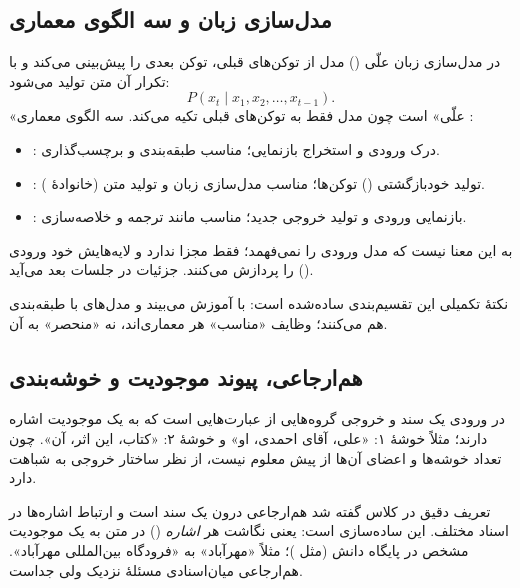 \subsection{مدل‌سازی زبان و سه الگوی معماری}
در مدل‌سازی زبان علّی () مدل از توکن‌های قبلی، توکن بعدی را پیش‌بینی می‌کند و با تکرار آن متن تولید می‌شود:
\[
P(x_t\mid x_1,x_2,\ldots,x_{t-1}).
\]
«علّی» است چون مدل فقط به توکن‌های قبلی تکیه می‌کند. سه الگوی معماری :
\begin{itemize}
  \item \textbf{}: درک ورودی و استخراج بازنمایی؛ مناسب طبقه‌بندی و برچسب‌گذاری.
  \item \textbf{}: تولید خودبازگشتی () توکن‌ها؛ مناسب مدل‌سازی زبان و تولید متن (خانوادهٔ ).
  \item \textbf{}: بازنمایی ورودی و تولید خروجی جدید؛ مناسب  مانند ترجمه و خلاصه‌سازی.
\end{itemize}
 به این معنا نیست که مدل ورودی را نمی‌فهمد؛ فقط  مجزا ندارد و لایه‌هایش خود ورودی () را پردازش می‌کنند. جزئیات  در جلسات بعد می‌آید.

\begin{correctionbox}{نکتهٔ تکمیلی}
این تقسیم‌بندی ساده‌شده است:  با  آموزش می‌بیند و مدل‌های  با  طبقه‌بندی هم می‌کنند؛ وظایف «مناسب» هر معماری‌اند، نه «منحصر» به آن.
\end{correctionbox}

\subsection{هم‌ارجاعی، پیوند موجودیت و خوشه‌بندی}
در  ورودی یک سند و خروجی گروه‌هایی از عبارت‌هایی است که به یک موجودیت اشاره دارند؛ مثلاً خوشهٔ ۱: «علی، آقای احمدی، او» و خوشهٔ ۲: «کتاب، این اثر، آن». چون تعداد خوشه‌ها و اعضای آن‌ها از پیش معلوم نیست، از نظر ساختار خروجی به  شباهت دارد.

\begin{correctionbox}{تعریف دقیق }
در کلاس گفته شد هم‌ارجاعی درون یک سند است و  ارتباط اشاره‌ها در اسناد مختلف. این ساده‌سازی است:  یعنی نگاشت هر \emph{اشاره} () در متن به یک موجودیت مشخص در پایگاه دانش (مثل )؛ مثلاً «مهرآباد» به «فرودگاه بین‌المللی مهرآباد». هم‌ارجاعی میان‌اسنادی مسئلهٔ نزدیک ولی جداست.
\end{correctionbox}


